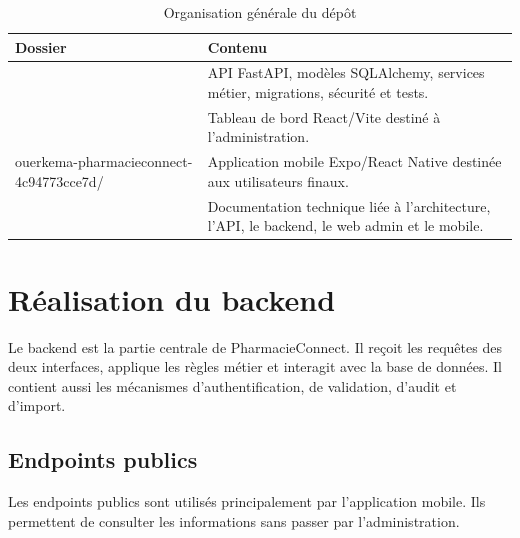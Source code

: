 \begin{table}[H]
    \centering
    \caption{Organisation générale du dépôt}
    \begin{tabular}{L{5.6cm}L{7.4cm}}
        \toprule
        \textbf{Dossier} & \textbf{Contenu} \\
        \midrule
         & API FastAPI, modèles SQLAlchemy, services métier, migrations, sécurité et tests. \\
         & Tableau de bord React/Vite destiné à l'administration. \\
        \begin{minipage}[t]{5.4cm}\ttfamily\small ouerkema-pharmacieconnect-\linebreak 4c94773cce7d/\end{minipage} & Application mobile Expo/React Native destinée aux utilisateurs finaux. \\
         & Documentation technique liée à l'architecture, l'API, le backend, le web admin et le mobile. \\
        \bottomrule
    \end{tabular}
\end{table}

\section{Réalisation du backend}

Le backend est la partie centrale de PharmacieConnect. Il reçoit les requêtes des deux interfaces, applique
les règles métier et interagit avec la base de données. Il contient aussi les mécanismes d'authentification,
de validation, d'audit et d'import.

\subsection{Endpoints publics}

Les endpoints publics sont utilisés principalement par l'application mobile. Ils permettent de consulter
les informations sans passer par l'administration.

